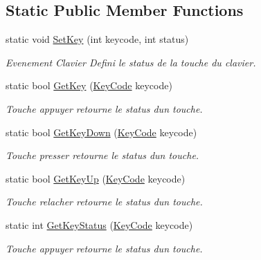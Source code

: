 \subsection*{Static Public Member Functions}
\begin{DoxyCompactItemize}
\item 
static void \mbox{\hyperlink{class_beer_engine_1_1_input_a8c64719adc226a57caf45ce63a0dddee}{Set\+Key}} (int keycode, int status)
\begin{DoxyCompactList}\small\item\em Evenement Clavier Defini le status de la touche du clavier. \end{DoxyCompactList}\item 
static bool \mbox{\hyperlink{class_beer_engine_1_1_input_aef391d62eeafff68a8b33d232e38c324}{Get\+Key}} (\mbox{\hyperlink{namespace_beer_engine_a94f0b552f6dc910de8cdb44207981f53}{Key\+Code}} keycode)
\begin{DoxyCompactList}\small\item\em Touche appuyer retourne le status d\textquotesingle{}un touche. \end{DoxyCompactList}\item 
static bool \mbox{\hyperlink{class_beer_engine_1_1_input_ab3093c905099025b3dcd0c67dc31ed82}{Get\+Key\+Down}} (\mbox{\hyperlink{namespace_beer_engine_a94f0b552f6dc910de8cdb44207981f53}{Key\+Code}} keycode)
\begin{DoxyCompactList}\small\item\em Touche presser retourne le status d\textquotesingle{}un touche. \end{DoxyCompactList}\item 
static bool \mbox{\hyperlink{class_beer_engine_1_1_input_aace9501b3e8bde001dc46dea904504b0}{Get\+Key\+Up}} (\mbox{\hyperlink{namespace_beer_engine_a94f0b552f6dc910de8cdb44207981f53}{Key\+Code}} keycode)
\begin{DoxyCompactList}\small\item\em Touche relacher retourne le status d\textquotesingle{}un touche. \end{DoxyCompactList}\item 
static int \mbox{\hyperlink{class_beer_engine_1_1_input_a36af1091a677481607d7a197585fd379}{Get\+Key\+Status}} (\mbox{\hyperlink{namespace_beer_engine_a94f0b552f6dc910de8cdb44207981f53}{Key\+Code}} keycode)
\begin{DoxyCompactList}\small\item\em Touche appuyer retourne le status d\textquotesingle{}un touche. \end{DoxyCompactList}\item 

\end{DoxyCompactItemize}
